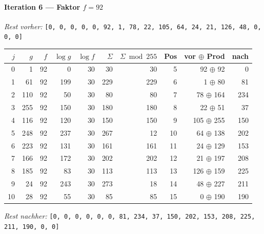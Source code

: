 \paragraph{Iteration 6 — Faktor $f = 92$}
\textit{Rest vorher:} \texttt{[0, 0, 0, 0, 0, 92, 1, 78, 22, 105, 64, 24, 21, 126, 48, 0, 0, 0]}\par
\begin{center}
\footnotesize
\setlength{\tabcolsep}{4pt}
\renewcommand{\arraystretch}{1.1}
\begin{tabular}{r|rr|rrrr|rrr}
\toprule
$j$ & $g$ & $f$ & $\log g$ & $\log f$ & $\Sigma$ & $\Sigma\bmod 255$ & Pos & vor $\oplus$ Prod & nach \\
\midrule
0 & 1 & 92 & 0 & 30 & 30 & 30 & 5 & 92 $\oplus$ 92 & 0 \\
1 & 61 & 92 & 199 & 30 & 229 & 229 & 6 & 1 $\oplus$ 80 & 81 \\
2 & 110 & 92 & 50 & 30 & 80 & 80 & 7 & 78 $\oplus$ 164 & 234 \\
3 & 255 & 92 & 150 & 30 & 180 & 180 & 8 & 22 $\oplus$ 51 & 37 \\
4 & 116 & 92 & 120 & 30 & 150 & 150 & 9 & 105 $\oplus$ 255 & 150 \\
5 & 248 & 92 & 237 & 30 & 267 & 12 & 10 & 64 $\oplus$ 138 & 202 \\
6 & 223 & 92 & 131 & 30 & 161 & 161 & 11 & 24 $\oplus$ 129 & 153 \\
7 & 166 & 92 & 172 & 30 & 202 & 202 & 12 & 21 $\oplus$ 197 & 208 \\
8 & 185 & 92 & 83 & 30 & 113 & 113 & 13 & 126 $\oplus$ 159 & 225 \\
9 & 24 & 92 & 243 & 30 & 273 & 18 & 14 & 48 $\oplus$ 227 & 211 \\
10 & 28 & 92 & 55 & 30 & 85 & 85 & 15 & 0 $\oplus$ 190 & 190 \\
\bottomrule
\end{tabular}
\end{center}
\textit{Rest nachher:} \texttt{[0, 0, 0, 0, 0, 0, 81, 234, 37, 150, 202, 153, 208, 225, 211, 190, 0, 0]}\par\medskip
